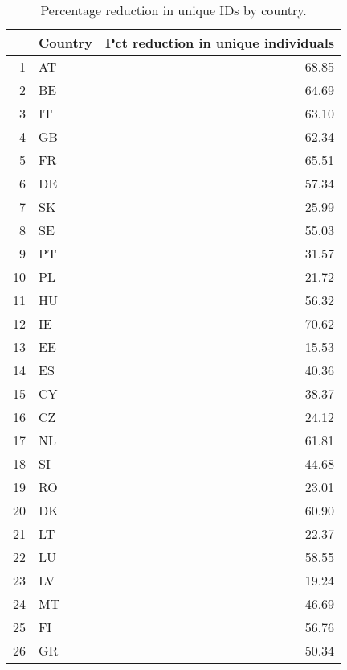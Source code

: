 \begin{table}[ht]
\centering
\begin{tabular}{rlr}
  \hline
 & Country & Pct reduction in unique individuals \\ 
  \hline
1 & AT & 68.85 \\ 
  2 & BE & 64.69 \\ 
  3 & IT & 63.10 \\ 
  4 & GB & 62.34 \\ 
  5 & FR & 65.51 \\ 
  6 & DE & 57.34 \\ 
  7 & SK & 25.99 \\ 
  8 & SE & 55.03 \\ 
  9 & PT & 31.57 \\ 
  10 & PL & 21.72 \\ 
  11 & HU & 56.32 \\ 
  12 & IE & 70.62 \\ 
  13 & EE & 15.53 \\ 
  14 & ES & 40.36 \\ 
  15 & CY & 38.37 \\ 
  16 & CZ & 24.12 \\ 
  17 & NL & 61.81 \\ 
  18 & SI & 44.68 \\ 
  19 & RO & 23.01 \\ 
  20 & DK & 60.90 \\ 
  21 & LT & 22.37 \\ 
  22 & LU & 58.55 \\ 
  23 & LV & 19.24 \\ 
  24 & MT & 46.69 \\ 
  25 & FI & 56.76 \\ 
  26 & GR & 50.34 \\ 
   \hline
\end{tabular}
\caption{Percentage reduction in unique IDs by country.} 
\label{tab:id_pct_reduction}
\end{table}
